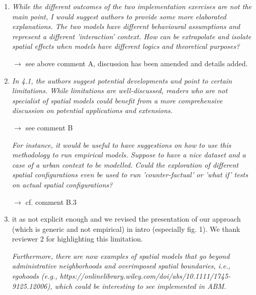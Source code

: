 \documentclass[11pt,a4paper,sans]{moderncv}        %
\begin{document}
\begin{enumerate}

  \item \textit{While the different outcomes of the two implementation exercises are not the main point, I would suggest authors to provide some more elaborated explanations. The two models have different behavioural assumptions and represent a different 'interaction' context. How can be extrapolate and isolate spatial effects when models have different logics and theoretical purposes?}
  
  $\rightarrow$ see above comment A, discussion has been amended and details added.
  \medskip

  \item \textit{In 4.1, the authors suggest potential developments and point to certain limitations. While limitations are well-discussed, readers who are not specialist of spatial models could benefit from a more comprehensive discussion on potential applications and extensions.}
  
  $\rightarrow$ see comment B
  
  \medskip
  
  \textit{For instance, it would be useful to have suggestions on how to use this methodology to run empirical models. Suppose to have a nice dataset and a case of a urban context to be modelled. Could the exploration of different spatial configurations even be used to run 'counter-factual' or 'what if' tests on actual spatial configurations?}
  
  $\rightarrow$ cf. comment B.3
  
  \item it as not explicit enough and we revised the presentation of our approach (which is generic and not empirical) in intro (especially fig. 1). We thank reviewer 2 for highlighting this limitation.

  \medskip

  \textit{Furthermore, there are now examples of spatial models that go beyond administrative neighborhoods and overimposed spatial boundaries, i.e., egohoods (e.g., https://onlinelibrary.wiley.com/doi/abs/10.1111/1745-9125.12006), which could be interesting to see implemented in ABM.}
  

\end{enumerate}
\end{document}
